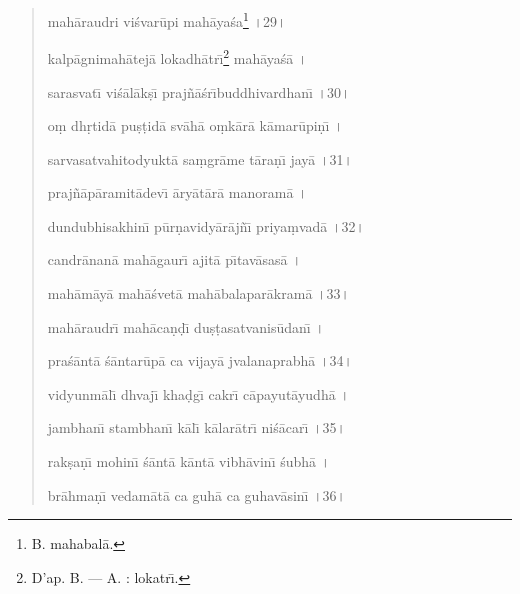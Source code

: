 \documentclass[a4paper, 11pt, oneside, french]{article}
\begin{document}
\begin{quotation}
mah\={a}raudri vi\'{s}var\={u}pi mah\={a}ya\'{s}a\footnote{B. mahabal\={a}.} \texthindi{।}29\texthindi{।}

\bigskip

kalp\={a}gnimah\={a}tej\={a} lokadh\={a}tr\={\i}\footnote{D'ap. B. --- A. : lokatr\={\i}.} mah\={a}ya\'{s}\={a} \texthindi{।}

sarasvat\={\i} vi\'{s}\={a}l\={a}k\d{s}\={\i} praj\~{n}\={a}\'{s}r\={\i}buddhivardhan\={\i} \texthindi{।}30\texthindi{।}

\bigskip

o\d{m} dh\d{r}tid\={a} pu\d{s}\d{t}id\={a} sv\={a}h\={a} o\d{m}k\={a}r\={a} k\={a}mar\={u}pi\d{n}\={\i} \texthindi{।}

sarvasatvahitodyukt\={a} sa\d{m}gr\={a}me t\={a}ra\d{n}\={\i} jay\={a} \texthindi{।}31\texthindi{।}

\bigskip

praj\~{n}\={a}p\={a}ramit\={a}dev\={\i} \={a}ry\={a}t\={a}r\={a} manoram\={a} \texthindi{।}

dundubhisakhin\={\i} p\={u}r\d{n}avidy\={a}r\={a}j\~{n}\={\i} priya\d{m}vad\={a} \texthindi{।}32\texthindi{।}

\bigskip

candr\={a}nan\={a} mah\={a}gaur\={\i} ajit\={a} p\={\i}tav\={a}sas\={a} \texthindi{।}

mah\={a}m\={a}y\={a} mah\={a}\'{s}vet\={a} mah\={a}balapar\={a}kram\={a} \texthindi{।}33\texthindi{।}

\bigskip

mah\={a}raudr\={\i} mah\={a}ca\d{n}\d{d}\={\i} du\d{s}\d{t}asatvanis\={u}dan\={\i} \texthindi{।}

pra\'{s}\={a}nt\={a} \'{s}\={a}ntar\={u}p\={a} ca vijay\={a} jvalanaprabh\={a} \texthindi{।}34\texthindi{।}

\bigskip

vidyunm\={a}l\={\i} dhvaj\={\i} kha\d{d}g\={\i} cakr\={\i} c\={a}payut\={a}yudh\={a} \texthindi{।}

jambhan\={\i} stambhan\={\i} k\={a}l\={\i} k\={a}lar\={a}tr\={\i} ni\'{s}\={a}car\={\i} \texthindi{।}35\texthindi{।}

\bigskip

rak\d{s}a\d{n}\={\i} mohin\={\i} \'{s}\={a}nt\={a} k\={a}nt\={a} vibh\={a}vin\={\i} \'{s}ubh\={a} \texthindi{।}

br\={a}hma\d{n}\={\i} vedam\={a}t\={a} ca guh\={a} ca guhav\={a}sin\={\i} \texthindi{।}36\texthindi{।}

\bigskip


\end{quotation}
\end{document}
